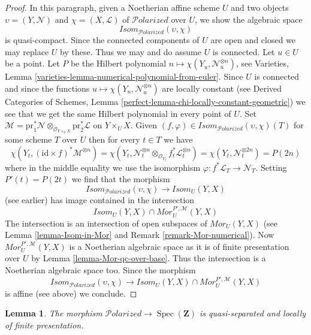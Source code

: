 \documentclass{stacks-project}
\theoremstyle{plain}
\newtheorem{lemma}[subsection]{Lemma}
\theoremstyle{definition}
\theoremstyle{remark}
\numberwithin{equation}{subsection}
\def\Spec{\mathop{\mathrm{Spec}}}
\def\Polarizedstack{\mathcal{P}\!\mathit{olarized}}
\begin{document}
\begin{proof}
\medskip\noindent
In this paragraph, given a Noetherian affine scheme $U$ and two objects
$\upsilon = (Y, \mathcal{N})$ and $\chi = (X, \mathcal{L})$
of $\Polarizedstack$ over $U$, we show the algebraic space
$$
\mathit{Isom}_{\Polarizedstack}(\upsilon, \chi)
$$
is quasi-compact. Since the connected components of $U$ are open and closed
we may replace $U$ by these. Thus we may and do assume $U$ is connected.
Let $u \in U$ be a point. Let $P$ be the Hilbert polynomial
$n \mapsto \chi(Y_u, \mathcal{N}_u^{\otimes n})$, see
Varieties, Lemma \ref{varieties-lemma-numerical-polynomial-from-euler}.
Since $U$ is connected and since
the functions $u \mapsto \chi(Y_u, \mathcal{N}_u^{\otimes n})$
are locally constant (see 
Derived Categories of Schemes, Lemma
\ref{perfect-lemma-chi-locally-constant-geometric})
we see that we get the same Hilbert polynomial in every point of $U$.
Set
$\mathcal{M} = \text{pr}_1^*\mathcal{N}
\otimes_{\mathcal{O}_{Y \times_U X}} \text{pr}_2^*\mathcal{L}$
on $Y \times_U X$. Given
$(f, \varphi) \in \mathit{Isom}_{\Polarizedstack}(\upsilon, \chi)(T)$
for some scheme $T$ over $U$ then for every $t \in T$ we have
$$
\chi(Y_t, (\text{id} \times f)^*\mathcal{M}^{\otimes n}) =
\chi(Y_t,
\mathcal{N}_t^{\otimes n} \otimes_{\mathcal{O}_{Y_t}}
f_t^*\mathcal{L}_t^{\otimes n}) =
\chi(Y_t, \mathcal{N}_t^{\otimes 2n}) = P(2n)
$$
where in the middle equality we use the isomorphism
$\varphi : f^*\mathcal{L}_T \to \mathcal{N}_T$.
Setting $P'(t) = P(2t)$ we find that the morphism
$$
\mathit{Isom}_{\Polarizedstack}(\upsilon, \chi)
\longrightarrow
\mathit{Isom}_U(Y, X)
$$
(see earlier) has image contained in the intersection
$$
\mathit{Isom}_U(Y, X) \cap \mathit{Mor}^{P', \mathcal{M}}_U(Y, X)
$$
The intersection is an intersection of open subspaces of
$\mathit{Mor}_U(Y, X)$ (see Lemma \ref{lemma-Isom-in-Mor} and
Remark \ref{remark-Mor-numerical}).
Now $\mathit{Mor}^{P', \mathcal{M}}_U(Y, X)$
is a Noetherian algebraic space as it is of finite
presentation over $U$ by Lemma \ref{lemma-Mor-qc-over-base}.
Thus the intersection
is a Noetherian algebraic space too. Since the morphism
$$
\mathit{Isom}_{\Polarizedstack}(\upsilon, \chi)
\longrightarrow
\mathit{Isom}_U(Y, X) \cap \mathit{Mor}^{P', \mathcal{M}}_U(Y, X)
$$
is affine (see above) we conclude.
\end{proof}

\begin{lemma}
\label{lemma-polarized-qs-lfp}
The morphism $\Polarizedstack \to \Spec(\mathbf{Z})$ is quasi-separated and
locally of finite presentation.
\end{lemma}
\end{document}
